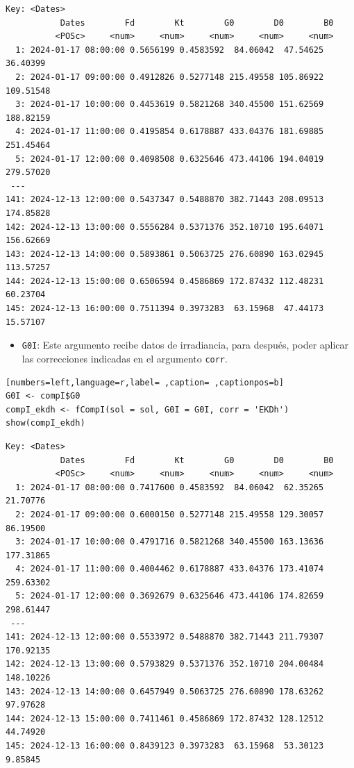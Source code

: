 \begin{itemize}
\begin{verbatim}
Key: <Dates>
		   Dates        Fd        Kt        G0        D0        B0
		  <POSc>     <num>     <num>     <num>     <num>     <num>
  1: 2024-01-17 08:00:00 0.5656199 0.4583592  84.06042  47.54625  36.40399
  2: 2024-01-17 09:00:00 0.4912826 0.5277148 215.49558 105.86922 109.51548
  3: 2024-01-17 10:00:00 0.4453619 0.5821268 340.45500 151.62569 188.82159
  4: 2024-01-17 11:00:00 0.4195854 0.6178887 433.04376 181.69885 251.45464
  5: 2024-01-17 12:00:00 0.4098508 0.6325646 473.44106 194.04019 279.57020
 ---                                                                      
141: 2024-12-13 12:00:00 0.5437347 0.5488870 382.71443 208.09513 174.85828
142: 2024-12-13 13:00:00 0.5556284 0.5371376 352.10710 195.64071 156.62669
143: 2024-12-13 14:00:00 0.5893861 0.5063725 276.60890 163.02945 113.57257
144: 2024-12-13 15:00:00 0.6506594 0.4586869 172.87432 112.48231  60.23704
145: 2024-12-13 16:00:00 0.7511394 0.3973283  63.15968  47.44173  15.57107
\end{verbatim}

\begin{itemize}
\item \texttt{G0I}: Este argumento recibe datos de irradiancia, para después, poder aplicar las correcciones indicadas en el argumento \texttt{corr}.
\end{itemize}
\begin{lstlisting}[numbers=left,language=r,label= ,caption= ,captionpos=b]
G0I <- compI$G0
compI_ekdh <- fCompI(sol = sol, G0I = G0I, corr = 'EKDh')
show(compI_ekdh)
\end{lstlisting}

\begin{verbatim}
Key: <Dates>
		   Dates        Fd        Kt        G0        D0        B0
		  <POSc>     <num>     <num>     <num>     <num>     <num>
  1: 2024-01-17 08:00:00 0.7417600 0.4583592  84.06042  62.35265  21.70776
  2: 2024-01-17 09:00:00 0.6000150 0.5277148 215.49558 129.30057  86.19500
  3: 2024-01-17 10:00:00 0.4791716 0.5821268 340.45500 163.13636 177.31865
  4: 2024-01-17 11:00:00 0.4004462 0.6178887 433.04376 173.41074 259.63302
  5: 2024-01-17 12:00:00 0.3692679 0.6325646 473.44106 174.82659 298.61447
 ---                                                                      
141: 2024-12-13 12:00:00 0.5533972 0.5488870 382.71443 211.79307 170.92135
142: 2024-12-13 13:00:00 0.5793829 0.5371376 352.10710 204.00484 148.10226
143: 2024-12-13 14:00:00 0.6457949 0.5063725 276.60890 178.63262  97.97628
144: 2024-12-13 15:00:00 0.7411461 0.4586869 172.87432 128.12512  44.74920
145: 2024-12-13 16:00:00 0.8439123 0.3973283  63.15968  53.30123   9.85845
\end{verbatim}


\end{itemize}
